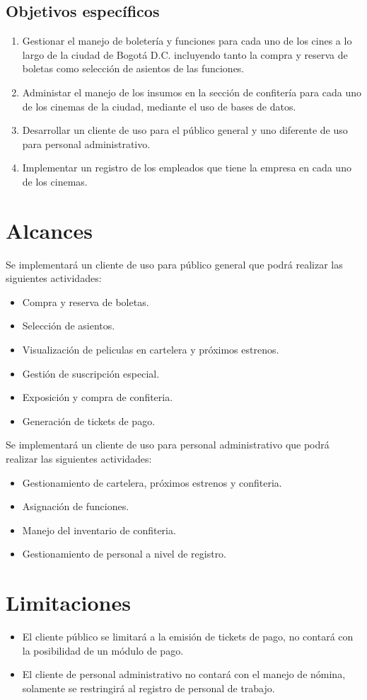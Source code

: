 \subsection{Objetivos específicos}

\begin{enumerate}
	\item Gestionar el manejo de boletería y funciones para cada uno de los cines a lo largo de la ciudad de Bogotá D.C. incluyendo tanto la compra y reserva de boletas como selección de asientos de las funciones.
	\item Administar el manejo de los insumos en la sección de confitería para cada uno de los cinemas de la ciudad, mediante el uso de bases de datos.
	\item Desarrollar un cliente de uso para el público general y uno diferente de uso para personal administrativo.
	\item Implementar un registro de los empleados que tiene la empresa en cada uno de los cinemas. 
\end{enumerate}

\section{Alcances}
Se implementará un cliente de uso para público general que podrá realizar las siguientes actividades:
\begin{itemize}
	\item Compra y reserva de boletas.
	\item Selección de asientos.
	\item Visualización de peliculas en cartelera y próximos estrenos.
	\item Gestión de suscripción especial.
	\item Exposición y compra de confiteria.
	\item Generación de tickets de pago.
\end{itemize}

Se implementará un cliente de uso para personal administrativo que podrá realizar las siguientes actividades:
\begin{itemize}
	\item Gestionamiento de cartelera, próximos estrenos y confiteria.
	\item Asignación de funciones.
	\item Manejo del inventario de confiteria.
	\item Gestionamiento de personal a nivel de registro.
\end{itemize}


\section{Limitaciones}
\begin{itemize}
\item El cliente público se limitará a la emisión de tickets de pago, no contará con la posibilidad de un módulo de pago.

\item El cliente de personal administrativo no contará con el manejo de nómina, solamente se restringirá al registro de personal de trabajo.
\end{itemize}


